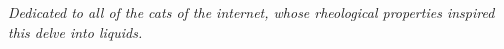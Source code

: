 \chapter*{}
\vspace*{0.2\textheight}
\begin{center}
\noindent\emph{Dedicated to all of the cats of the internet, whose rheological properties inspired this delve into liquids.}
\end{center}
